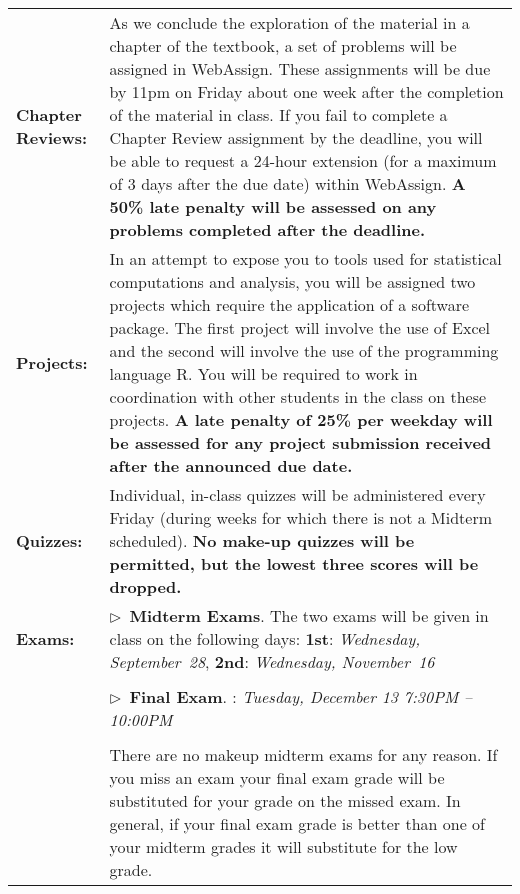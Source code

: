 \documentclass[11pt]{article}
\begin{document}
\begin{longtable}{lp{5.2in}}
\textbf{\parbox[t][1.0in][t]{1.0in}{Chapter Reviews:}}
   & As we conclude the exploration of the material in a chapter of the textbook, a set of problems will be assigned in WebAssign. These assignments will be due by 11pm on Friday about one week after the completion of the material in class. If you fail to complete a Chapter Review assignment by the deadline, you will be able to request a 24-hour extension (for a maximum of 3 days after the due date) within WebAssign. {\bf A 50\% late penalty will be assessed on any problems completed after the deadline.}
    \\[8pt]

\textbf{Projects:}    
    & In an attempt to expose you to tools used for statistical computations and analysis, you will be assigned two projects which require the application of a software package. The first project will involve the use of Excel and the second will involve the use of the programming language R. You will be required to work in coordination with other students in the class on these projects. {\bf A late penalty of 25\% per weekday will be assessed for any project submission received after the announced due date.}
    \\[8pt]

\textbf{Quizzes:}
   & Individual, in-class quizzes will be administered every Friday (during weeks for which there is not a Midterm scheduled). {\bf No make-up quizzes will be permitted, but the lowest three scores will be dropped.}
   \\[8pt]
%
\textbf{Exams:}
   & $\triangleright$~\textbf{Midterm Exams}.\/
    \newline
    The two exams will be given in class on the following days:
    \newline
    \textbf{1st}: \textsl{Wednesday, September~28},
    \newline
    \textbf{2nd}: \textsl{Wednesday, November~16}
   \\
   \\
   & $\triangleright$~\textbf{Final Exam}.\/
    \newline
    	{\underbar{Section 001}}:   \textsl{Tuesday, December 13 7:30\/PM -- 10:00\/PM}
  \\
  \\
  & There are no makeup midterm exams for any reason. If you miss an exam your final exam grade will be substituted for your grade on the missed exam. In general, if your final exam grade is better than one of your midterm grades it will substitute for the low grade. 
  \\[20pt]


\end{longtable}
\end{document}
